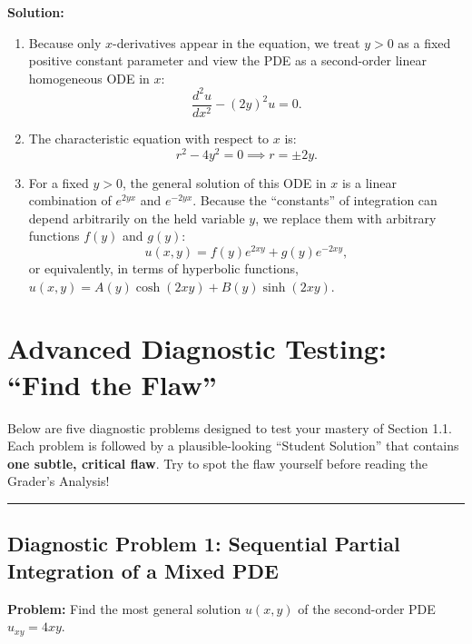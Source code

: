 \documentclass[11pt,a4paper]{article}
\begin{document}
\textbf{Solution:}
\begin{enumerate}
    \item Because only $x$-derivatives appear in the equation, we treat $y > 0$ as a fixed positive constant parameter and view the PDE as a second-order linear homogeneous ODE in $x$:
    \[
        \frac{d^2 u}{dx^2} - (2y)^2 u = 0.
    \]
    \item The characteristic equation with respect to $x$ is:
    \[
        r^2 - 4y^2 = 0 \implies r = \pm 2y.
    \]
    \item For a fixed $y > 0$, the general solution of this ODE in $x$ is a linear combination of $e^{2yx}$ and $e^{-2yx}$. Because the ``constants'' of integration can depend arbitrarily on the held variable $y$, we replace them with arbitrary functions $f(y)$ and $g(y)$:
    \[
        u(x, y) = f(y)e^{2xy} + g(y)e^{-2xy},
    \]
    or equivalently, in terms of hyperbolic functions, $u(x, y) = A(y)\cosh(2xy) + B(y)\sinh(2xy)$.
\end{enumerate}

\newpage
\section{Advanced Diagnostic Testing: ``Find the Flaw''}

Below are five diagnostic problems designed to test your mastery of Section 1.1. Each problem is followed by a plausible-looking ``Student Solution'' that contains \textbf{one subtle, critical flaw}. Try to spot the flaw yourself before reading the Grader's Analysis!

\bigskip
\hrule
\bigskip

\subsection*{Diagnostic Problem 1: Sequential Partial Integration of a Mixed PDE}
\textbf{Problem:} Find the most general solution $u(x, y)$ of the second-order PDE $u_{xy} = 4xy$.
\end{document}

